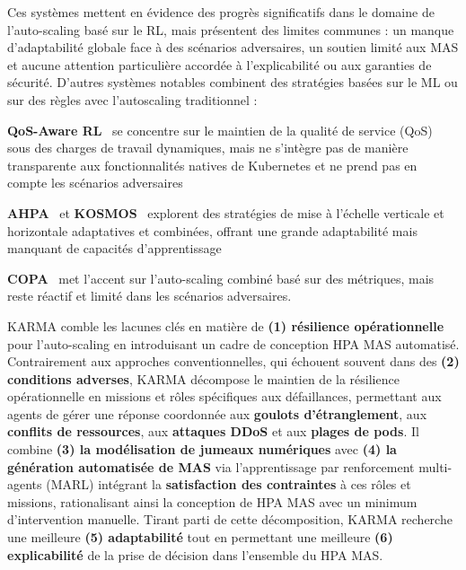 Ces systèmes mettent en évidence des progrès significatifs dans le domaine de l'auto-scaling basé sur le RL, mais présentent des limites communes : un manque d'adaptabilité globale face à des scénarios adversaires, un soutien limité aux MAS et aucune attention particulière accordée à l'explicabilité ou aux garanties de sécurité.
%
D'autres systèmes notables combinent des stratégies basées sur le ML ou sur des règles avec l'autoscaling traditionnel :
%
\begin{enumerate*}[label={}, itemjoin={;\quad }]
    \item \textbf{QoS-Aware RL}~\cite{QoSRL} se concentre sur le maintien de la qualité de service (QoS) sous des charges de travail dynamiques, mais ne s'intègre pas de manière transparente aux fonctionnalités natives de Kubernetes et ne prend pas en compte les scénarios adversaires
    \item \textbf{AHPA}~\cite{Zhou2024} et \textbf{KOSMOS}~\cite{KOSMOS} explorent des stratégies de mise à l'échelle verticale et horizontale adaptatives et combinées, offrant une grande adaptabilité mais manquant de capacités d'apprentissage
    \item \textbf{COPA}~\cite{COPA} met l'accent sur l'auto-scaling combiné basé sur des métriques, mais reste réactif et limité dans les scénarios adversaires.
\end{enumerate*}

KARMA comble les lacunes clés en matière de \textbf{(1) résilience opérationnelle} pour l'auto-scaling en introduisant un cadre de conception HPA MAS automatisé. Contrairement aux approches conventionnelles, qui échouent souvent dans des \textbf{(2) conditions adverses}, KARMA décompose le maintien de la résilience opérationnelle en missions et rôles spécifiques aux défaillances, permettant aux agents de gérer une réponse coordonnée aux \textbf{goulots d'étranglement}, aux \textbf{conflits de ressources}, aux \textbf{attaques DDoS} et aux \textbf{plages de pods}. Il combine \textbf{(3) la modélisation de jumeaux numériques} avec \textbf{(4) la génération automatisée de MAS} via l'apprentissage par renforcement multi-agents (MARL) intégrant la \textbf{satisfaction des contraintes} à ces rôles et missions, rationalisant ainsi la conception de HPA MAS avec un minimum d'intervention manuelle. Tirant parti de cette décomposition, KARMA recherche une meilleure \textbf{(5) adaptabilité} tout en permettant une meilleure \textbf{(6) explicabilité} de la prise de décision dans l'ensemble du HPA MAS.


